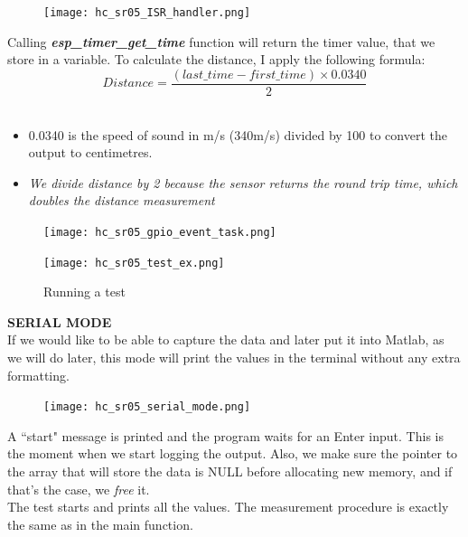\documentclass[14pt]{article}
\begin{document}
\begin{normalsize}
		\begin{figure}[h]
			\centering
			\texttt{[image: hc\_sr05\_ISR\_handler.png]}
		\end{figure}\vspace{10pt}
		Calling \textbf{\textit{esp\_timer\_get\_time}} function will return the timer value, that we store in a variable. To calculate the distance, I apply the following formula:\\
		\begin{equation*}
			Distance =  \frac{(last\_time - first\_time) \times 0.0340}{2}
		\end{equation*}\\
		\begin{itemize}
			\item 0.0340 is the speed of sound in m/s (340m/s) divided by 100 to convert the output to centimetres.
			\item \textit{We divide distance by 2 because the sensor returns the round trip time, which doubles the distance
				measurement}
		\end{itemize}
		\begin{figure}[h]
			\centering
			\texttt{[image: hc\_sr05\_gpio\_event\_task.png]}
		\end{figure}
		\vspace{20pt}
		\begin{figure}[h]
			\centering
			\texttt{[image: hc\_sr05\_test\_ex.png]}
			\caption{Running a test}
		\end{figure}
		\newpage
		\large \textbf{SERIAL MODE}\normalsize\\
		
		If we would like to be able to capture the data and later put it into Matlab, as we will do later, this mode will print the values in the terminal without any extra formatting.\vspace{-10pt}\\
		\setlength{\intextsep}{0pt}
		\begin{figure}
			\texttt{[image: hc\_sr05\_serial\_mode.png]}
		\end{figure}
		A ``start" message is printed and the program waits for an Enter input. This is the moment when we start logging the output. Also, we make sure the pointer to the array that will store the data is NULL before allocating new memory, and if that's the case, we \textit{free} it.\\
		
		\noindent The test starts and prints all the values. The measurement procedure is exactly the same as in the main function.\\
		

\end{normalsize}
\end{document}
